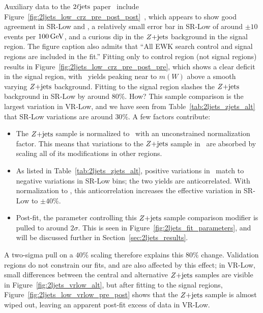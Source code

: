 Auxiliary data to the $\twoljets$ paper~\cite{atlas2022searches} include
Figure~\ref{fig:2ljets_low_crz_pre_post_post}~\cite{hepdata.116034.v1/t101},
which appears to show good agreement in SR-Low and \crz, a relatively
small error bar in SR-Low of around $\pm10$ events per $100\,\eV[G]$,
and a curious dip in the $\zjets$ background in the signal region.
The figure caption also admits that
``All EWK search control and signal regions are included in the fit.''
Fitting only to control region (not signal regions) results in
Figure~\ref{fig:2ljets_low_crz_pre_post_pre}, which shows a clear deficit in
the signal region, with \diboson\ yields peaking near to $m(W)$ above a smooth
varying $\zjets$ background.
Fitting to the signal region slashes the $\zjets$ background in SR-Low by
around $80\%$. How?
This sample comparison is the largest variation in VR-Low, and we have seen
from Table~\ref{tab:2ljets_zjets_alt} that SR-Low variations are around $30\%$.
A few factors contribute:
\begin{itemize}
\item The $\zjets$ sample is normalized to \crz\ with an unconstrained
normalization factor. This means that variations to the $\zjets$ sample in
\crz\ are absorbed by scaling all of its modifications in other regions.
\item As listed in Table~\ref{tab:2ljets_zjets_alt}, positive variations
in \crz\ match to negative variations in SR-Low bins; the two yields are
anticorrelated.
With normalization to \crz, this anticorrelation increases the effective
variation in SR-Low to $\pm40\%$.
\item Post-fit, the parameter controlling this $\zjets$ sample comparison
modifier is pulled to around $2\sigma$. This is seen in
Figure~\ref{fig:2ljets_fit_parameters}, and will be discussed further in
Section~\ref{sec:2ljets_results}.
\end{itemize}
A two-sigma pull on a $40\%$ scaling therefore explains this $80\%$ change.
Validation regions do not constrain our fits, and are also affected by
this effect; in VR-Low, small differences between the central and alternative
$\zjets$ samples are visible in Figure~\ref{fig:2ljets_vrlow_alt}, but
after fitting to the signal regions,
Figure~\ref{fig:2ljets_low_vrlow_pre_post} shows that the $\zjets$ sample
is almost wiped out, leaving an apparent post-fit excess of data in VR-Low.

